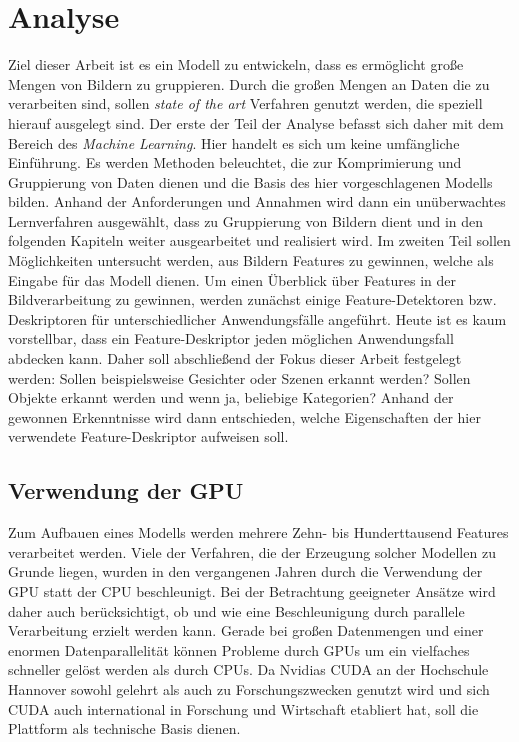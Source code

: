 \chapter{Analyse}

Ziel dieser Arbeit ist es ein Modell zu entwickeln, dass es ermöglicht große Mengen von Bildern zu gruppieren. Durch die großen Mengen an Daten die zu verarbeiten sind, sollen \textit{state of the art} Verfahren genutzt werden, die speziell hierauf ausgelegt sind. Der erste der Teil der Analyse befasst sich daher mit dem Bereich des \textit{Machine Learning}. Hier handelt es sich um keine umfängliche Einführung. Es werden Methoden beleuchtet, die zur Komprimierung und Gruppierung von Daten dienen und die Basis des hier vorgeschlagenen Modells bilden. Anhand der Anforderungen und Annahmen wird dann ein unüberwachtes Lernverfahren ausgewählt, dass zu Gruppierung von Bildern dient und in den folgenden Kapiteln weiter ausgearbeitet und realisiert wird. \newline
Im zweiten Teil sollen Möglichkeiten untersucht werden, aus Bildern Features zu gewinnen, welche als Eingabe für das Modell dienen. Um einen Überblick über Features in der Bildverarbeitung zu gewinnen, werden zunächst einige Feature-Detektoren bzw. Deskriptoren für unterschiedlicher Anwendungsfälle angeführt. Heute ist es kaum vorstellbar, dass ein Feature-Deskriptor jeden möglichen Anwendungsfall abdecken kann. Daher soll abschließend der Fokus dieser Arbeit festgelegt werden: Sollen beispielsweise Gesichter oder Szenen erkannt werden? Sollen Objekte erkannt werden und wenn ja, beliebige Kategorien? Anhand der gewonnen Erkenntnisse wird dann entschieden, welche Eigenschaften der hier verwendete Feature-Deskriptor aufweisen soll. 

\section{Verwendung der GPU}

Zum Aufbauen eines Modells werden mehrere Zehn- bis Hunderttausend Features verarbeitet werden. Viele der Verfahren, die der Erzeugung solcher Modellen zu Grunde liegen, wurden in den vergangenen Jahren durch die Verwendung der GPU statt der CPU beschleunigt. Bei der Betrachtung geeigneter Ansätze wird daher auch berücksichtigt, ob und wie eine Beschleunigung durch parallele Verarbeitung erzielt werden kann. Gerade bei großen Datenmengen und einer enormen Datenparallelität können Probleme durch GPUs um ein vielfaches schneller gelöst werden als durch CPUs. Da Nvidias CUDA an der Hochschule Hannover sowohl gelehrt als auch zu Forschungszwecken genutzt wird und sich CUDA auch international in Forschung und Wirtschaft etabliert hat, soll die Plattform als technische Basis dienen. 

